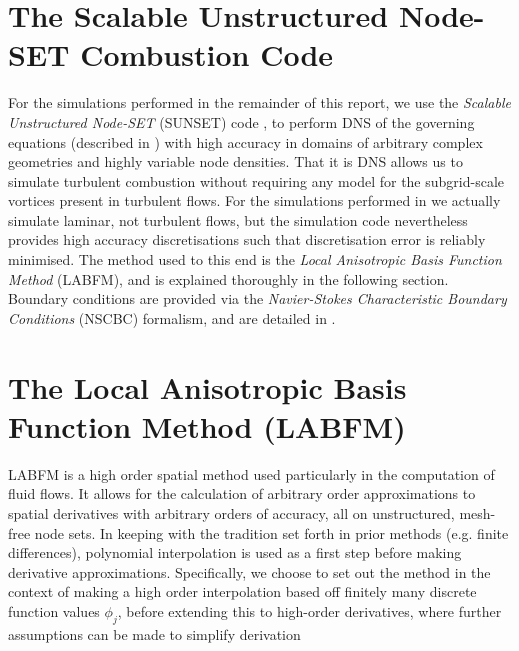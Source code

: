 
\section{The Scalable Unstructured Node-SET Combustion Code}

For the simulations performed in the remainder of this report, we use the \emph{Scalable Unstructured Node-SET} (SUNSET) code \cite{king2024SunsetFlamesDNSCode,king2024MeshFreeFrameworkHighOrdera}, to perform DNS of the governing equations (described in ) with high accuracy in domains of arbitrary complex geometries and highly variable node densities. That it is DNS allows us to simulate turbulent combustion without requiring any model for the subgrid-scale vortices present in turbulent flows. For the simulations performed in  we actually simulate laminar, not turbulent flows, but the simulation code nevertheless provides high accuracy discretisations such that discretisation error is reliably minimised. The method used to this end is the \emph{Local Anisotropic Basis Function Method} (LABFM), and is explained thoroughly in the following section. Boundary conditions are provided via the \emph{Navier-Stokes Characteristic Boundary Conditions} (NSCBC) formalism, and are detailed in .












\section{The Local Anisotropic Basis Function Method (LABFM)}

LABFM \cite{king2024MeshFreeFrameworkHighOrder, king2020HighOrderDifference, king2024MeshFreeFrameworkHighOrdera, king2022HighOrderSimulationsIsothermal, king2024SunsetFlamesDNSCode, broadley2025HighorderMeshfreeDirect, starepravo2025CanNeuralNetworks} is a high order spatial method used particularly in the computation of fluid flows. It allows for the calculation of arbitrary order approximations to spatial derivatives with arbitrary orders of accuracy, all on unstructured, mesh-free node sets. In keeping with the tradition set forth in prior methods (e.g. finite differences), polynomial interpolation is used as a first step before making derivative approximations. Specifically, we choose to set out the method in the context of making a high order interpolation based off finitely many discrete function values $\phi_j$, before extending this to high-order derivatives, where further assumptions can be made to simplify derivation


